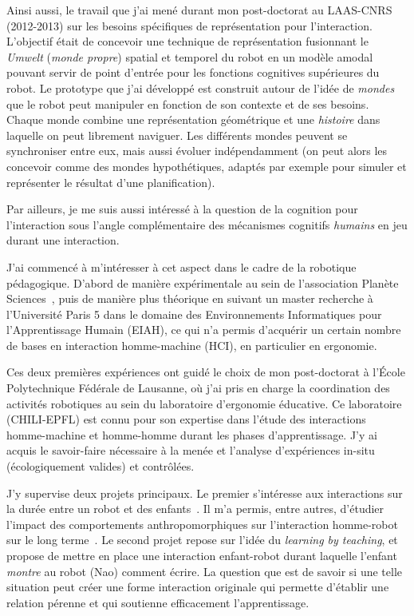 \documentclass[a4paper]{article}
\begin{document}
Ainsi aussi, le travail que j'ai mené durant mon post-doctorat au LAAS-CNRS
(2012-2013) sur les besoins spécifiques de représentation pour l'interaction.
L'objectif était de concevoir une technique de représentation fusionnant le
\emph{Umwelt} (\emph{monde propre}) spatial et temporel du robot en un modèle
amodal pouvant servir de point d'entrée pour les fonctions cognitives
supérieures du robot. Le prototype que j'ai développé est construit autour de
l'idée de \emph{mondes} que le robot peut manipuler en fonction de son contexte
et de ses besoins.  Chaque monde combine une représentation géométrique et
une \emph{histoire} dans laquelle on peut librement naviguer. Les différents mondes
peuvent se synchroniser entre eux, mais aussi évoluer indépendamment (on peut
alors les concevoir comme des mondes hypothétiques, adaptés par exemple pour
simuler et représenter le résultat d'une planification).

Par ailleurs, je me suis aussi intéressé à la question de la cognition pour
l'interaction sous l'angle complémentaire des mécanismes cognitifs
\emph{humains} en jeu durant une interaction.

J'ai commencé à m'intéresser à cet aspect dans le cadre de la robotique
pédagogique. D'abord de manière expérimentale au sein de l'association Planète
Sciences~\cite{stinckwich2007squeakbot}, puis de manière plus théorique en
suivant un master recherche à l'Université Paris 5 dans le domaine des
Environnements Informatiques pour l'Apprentissage Humain (EIAH), ce qui n'a permis
d'acquérir un certain nombre de bases en interaction homme-machine (HCI), en
particulier en ergonomie.

Ces deux premières expériences ont guidé le choix de mon post-doctorat à l'École
Polytechnique Fédérale de Lausanne, où j'ai pris en charge la coordination des
activités robotiques au sein du laboratoire d'ergonomie éducative. Ce
laboratoire (CHILI-EPFL) est connu pour son expertise dans l'étude des
interactions homme-machine et homme-homme durant les phases d'apprentissage. J'y
ai acquis le savoir-faire nécessaire à la menée et l'analyse d'expériences
in-situ (écologiquement valides) et contrôlées.

J'y supervise deux projets principaux. Le premier s'intéresse aux interactions
sur la durée entre un robot et des enfants~\cite{fink2014which}. Il m'a
permis, entre autres, d'étudier l'impact des comportements anthropomorphiques
sur l'interaction homme-robot sur le long terme~\cite{lemaignan2014dynamics}. Le
second projet repose sur l'idée du \emph{learning by teaching}, et propose de
mettre en place une interaction enfant-robot durant laquelle l'enfant
\emph{montre} au robot (Nao) comment écrire. La question que est de savoir si
une telle situation peut créer une forme interaction originale qui permette
d'établir une relation pérenne et qui soutienne efficacement l'apprentissage.
\end{document}
